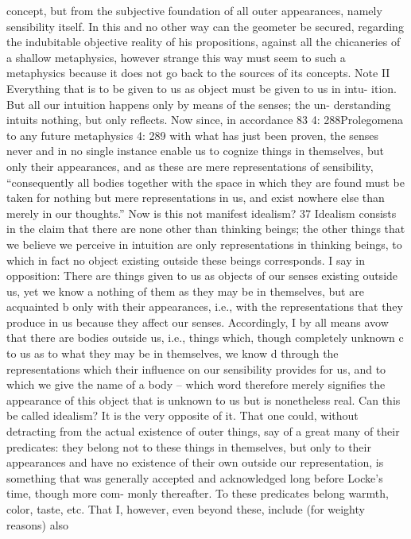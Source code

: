concept, but from the subjective foundation of all outer appearances,
namely sensibility itself. In this and no other way can the geometer be
secured, regarding the indubitable objective reality of his propositions,
against all the chicaneries of a shallow metaphysics, however strange this
way must seem to such a metaphysics because it does not go back to the
sources of its concepts.
Note II
Everything that is to be given to us as object must be given to us in intu-
ition. But all our intuition happens only by means of the senses; the un-
derstanding intuits nothing, but only reﬂects. Now since, in accordance
83
4: 288Prolegomena to any future metaphysics
4: 289
with what has just been proven, the senses never and in no single instance
enable us to cognize things in themselves, but only their appearances,
and as these are mere representations of sensibility, “consequently all
bodies together with the space in which they are found must be taken
for nothing but mere representations in us, and exist nowhere else than
merely in our thoughts.” Now is this not manifest idealism? 37
Idealism consists in the claim that there are none other than thinking
beings; the other things that we believe we perceive in intuition are only
representations in thinking beings, to which in fact no object existing
outside these beings corresponds. I say in opposition: There are things
given to us as objects of our senses existing outside us, yet we know a
nothing of them as they may be in themselves, but are acquainted b only
with their appearances, i.e., with the representations that they produce
in us because they affect our senses. Accordingly, I by all means avow
that there are bodies outside us, i.e., things which, though completely
unknown c to us as to what they may be in themselves, we know d through
the representations which their inﬂuence on our sensibility provides for
us, and to which we give the name of a body – which word therefore
merely signiﬁes the appearance of this object that is unknown to us but
is nonetheless real. Can this be called idealism? It is the very opposite of it.
That one could, without detracting from the actual existence of outer
things, say of a great many of their predicates: they belong not to these
things in themselves, but only to their appearances and have no existence
of their own outside our representation, is something that was generally
accepted and acknowledged long before Locke’s time, though more com-
monly thereafter. To these predicates belong warmth, color, taste, etc.
That I, however, even beyond these, include (for weighty reasons) also
